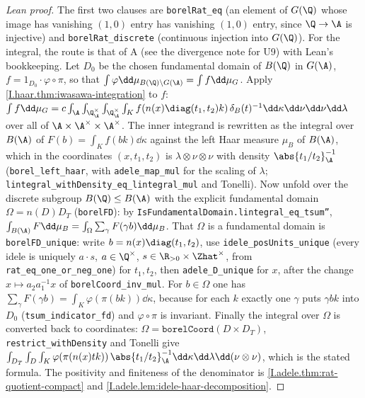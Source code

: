 \begin{proof}[Lean proof]
The first two clauses are \texttt{borelRat\_eq} (an element of $G(\Q)$ whose image has vanishing $(1,0)$ entry has vanishing $(1,0)$ entry, since $\Q\to\A$ is injective) and \texttt{borelRat\_discrete} (continuous injection into $G(\Q)$). For the integral, the route is that of A (see the divergence note for U9) with Lean's bookkeeping. Let $D_0$ be the chosen fundamental domain of $B(\Q)$ in $G(\A)$, $f=1_{D_0}\cdot\varphi\circ\pi$, so that $\int\varphi\dd\mu_{B(\Q)\backslash G(\A)}=\int f\dd\mu_G$. Apply \cref{I.haar.thm:iwasawa-integration} to $f$: $\int f\dd\mu_G=c\int_{\A}\int_{\Q^\times_{\A}}\int_{\Q^\times_{\A}}\int_K f(n(x)\diag(t_1,t_2)k)\,\delta_B(t)^{-1}\dd\kappa\dd\nu\dd\nu\dd\lambda$ over all of $\A\times\A^\times\times\A^\times$. The inner integrand is rewritten as the integral over $B(\A)$ of $F(b)=\int_Kf(bk)\dd\kappa$ against the left Haar measure $\mu_B$ of $B(\A)$, which in the coordinates $(x,t_1,t_2)$ is $\lambda\otimes\nu\otimes\nu$ with density $\abs{t_1/t_2}_\A^{-1}$ (\texttt{borel\_left\_haar}, with \texttt{adele\_map\_mul} for the scaling of $\lambda$; \texttt{lintegral\_withDensity\_eq\_lintegral\_mul} and Tonelli). Now unfold over the discrete subgroup $B(\Q)\le B(\A)$ with the explicit fundamental domain $\Omega=n(D)D_T$ (\texttt{borelFD}): by \texttt{IsFundamentalDomain.lintegral\_eq\_tsum''}, $\int_{B(\A)}F\dd\mu_B=\int_\Omega\sum_\gamma F(\gamma b)\dd\mu_B$. That $\Omega$ is a fundamental domain is \texttt{borelFD\_unique}: write $b=n(x)\diag(t_1,t_2)$, use \texttt{idele\_posUnits\_unique} (every idele is uniquely $a\cdot s$, $a\in\Q^\times$, $s\in\R_{>0}\times\Zhat^\times$, from \texttt{rat\_eq\_one\_or\_neg\_one}) for $t_1,t_2$, then \texttt{adele\_D\_unique} for $x$, after the change $x\mapsto a_2a_1^{-1}x$ of \texttt{borelCoord\_inv\_mul}. For $b\in\Omega$ one has $\sum_\gamma F(\gamma b)=\int_K\varphi(\pi(bk))\dd\kappa$, because for each $k$ exactly one $\gamma$ puts $\gamma bk$ into $D_0$ (\texttt{tsum\_indicator\_fd}) and $\varphi\circ\pi$ is invariant. Finally the integral over $\Omega$ is converted back to coordinates: $\Omega=\texttt{borelCoord}(D\times D_T)$, \texttt{restrict\_withDensity} and Tonelli give $\int_{D_T}\int_D\int_K\varphi(\pi(n(x)tk))\,\abs{t_1/t_2}_\A^{-1}\dd\kappa\dd\lambda\dd(\nu\otimes\nu)$, which is the stated formula. The positivity and finiteness of the denominator is \cref{I.adele.thm:rat-quotient-compact} and \cref{I.adele.lem:idele-haar-decomposition}.
\end{proof}

